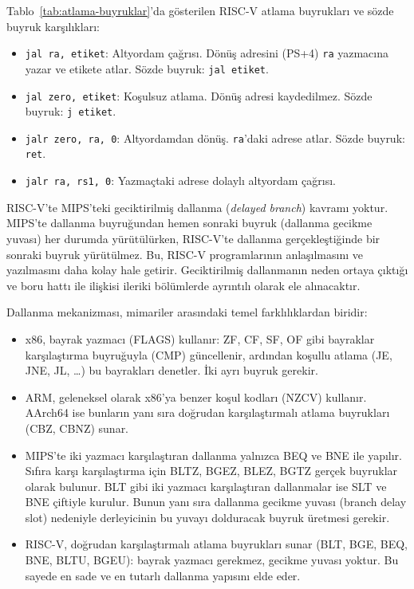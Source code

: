 Tablo~\ref{tab:atlama-buyruklar}'da gösterilen RISC-V atlama buyrukları ve sözde buyruk karşılıkları:
\begin{itemize}
\item \texttt{jal ra, etiket}: Altyordam çağrısı. Dönüş adresini (PS+4) \texttt{ra} yazmacına yazar ve etikete atlar. Sözde buyruk: \texttt{jal etiket}.
\item \texttt{jal zero, etiket}: Koşulsuz atlama. Dönüş adresi kaydedilmez. Sözde buyruk: \texttt{j etiket}.
\item \texttt{jalr zero, ra, 0}: Altyordamdan dönüş. \texttt{ra}'daki adrese atlar. Sözde buyruk: \texttt{ret}.
\item \texttt{jalr ra, rs1, 0}: Yazmaçtaki adrese dolaylı altyordam çağrısı.
\end{itemize}

\begin{bilginot}
RISC-V'te MIPS'teki geciktirilmiş dallanma (\textit{delayed branch}) kavramı yoktur. MIPS'te dallanma buyruğundan hemen sonraki buyruk (dallanma gecikme yuvası) her durumda yürütülürken, RISC-V'te dallanma gerçekleştiğinde bir sonraki buyruk yürütülmez. Bu, RISC-V programlarının anlaşılmasını ve yazılmasını daha kolay hale getirir. Geciktirilmiş dallanmanın neden ortaya çıktığı ve boru hattı ile ilişkisi ileriki bölümlerde ayrıntılı olarak ele alınacaktır.
\end{bilginot}

\begin{karsilastirma}
Dallanma mekanizması, mimariler arasındaki temel farklılıklardan biridir:
\begin{itemize}
  \item x86, bayrak yazmacı (FLAGS) kullanır: ZF, CF, SF, OF gibi bayraklar karşılaştırma buyruğuyla (CMP) güncellenir, ardından koşullu atlama (JE, JNE, JL, \ldots) bu bayrakları denetler. İki ayrı buyruk gerekir.
  \item ARM, geleneksel olarak x86'ya benzer koşul kodları (NZCV) kullanır. AArch64 ise bunların yanı sıra doğrudan karşılaştırmalı atlama buyrukları (CBZ, CBNZ) sunar.
  \item MIPS'te iki yazmacı karşılaştıran dallanma yalnızca BEQ ve BNE ile yapılır. Sıfıra karşı karşılaştırma için BLTZ, BGEZ, BLEZ, BGTZ gerçek buyruklar olarak bulunur. BLT gibi iki yazmacı karşılaştıran dallanmalar ise SLT ve BNE çiftiyle kurulur. Bunun yanı sıra dallanma gecikme yuvası (branch delay slot) nedeniyle derleyicinin bu yuvayı dolduracak buyruk üretmesi gerekir.
  \item RISC-V, doğrudan karşılaştırmalı atlama buyrukları sunar (BLT, BGE, BEQ, BNE, BLTU, BGEU): bayrak yazmacı gerekmez, gecikme yuvası yoktur. Bu sayede en sade ve en tutarlı dallanma yapısını elde eder.
\end{itemize}
\end{karsilastirma}

